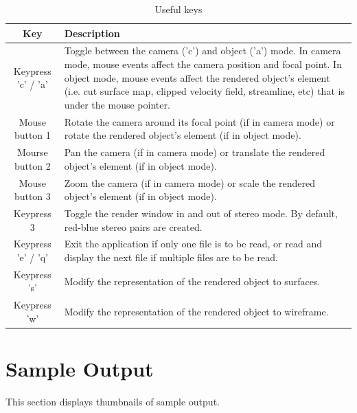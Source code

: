 \begin{table}[ht]
\begin{center}
\begin{tabular}{| c | p{13cm} |}
\hline
\textbf{Key} & \textbf{Description} \\ \hline
Keypress 'c' / 'a' & Toggle between the camera ('c') and object ('a')  mode. In 
camera mode, mouse events affect the camera position and focal point. In 
object mode, mouse events affect the rendered object's element (i.e.
cut surface map, clipped velocity field, streamline, etc) that is under the 
mouse pointer.\\ \hline
Mouse button 1 & Rotate the camera around its focal point (if in camera mode) 
or rotate the rendered object's element (if in object mode).\\ \hline
Mourse button 2 & Pan the camera (if in camera mode) or translate the rendered 
object's element (if in object mode). \\ \hline
Mouse button 3 & Zoom the camera (if in camera mode) or scale the rendered 
object's element (if in object mode). \\ \hline
Keypress 3 & Toggle the render window in and out of stereo mode. By default,
red-blue stereo pairs are created. \\ \hline
Keypress 'e' / 'q' & Exit the application if only one file is to be read, or 
read and display the next file if multiple files are to be read. \\ \hline
Keypress 's' & Modify the representation of the rendered object to surfaces.
\\ \hline
Keypress 'w' & Modify the representation of the rendered object to wireframe.
\\ \hline
\end{tabular}
\caption{Useful keys}
\end{center}
\end{table}




\newpage

\section{Sample Output}
This section displays thumbnails of sample output.  

